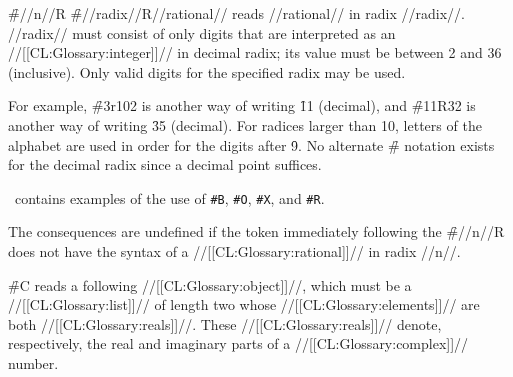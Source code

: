 \endsubsubsection%

  

\f{\#//n//R}
                                                              \f{\#//radix//R//rational//} reads //rational// in radix //radix//. //radix// must consist of only digits that are interpreted as an //[[CL:Glossary:integer]]// in decimal radix; its value must be between 2 and 36 (inclusive). Only valid digits for the specified radix may be used.

For example, \f{\#3r102} is another way of writing \f{11} (decimal),  and \f{\#11R32} is another way of writing \f{35} (decimal).   For radices larger than 10, letters of the alphabet are used in order for the digits after \f{9}. No alternate \f{\#} notation exists for the decimal radix since a decimal point suffices.

\Thenextfigure\ contains examples of the use of {\tt\#B}, {\tt \#O}, {\tt \#X}, and {\tt \#R}.


 The consequences are undefined if the token immediately following the \f{\#//n//R} does not have the syntax of a //[[CL:Glossary:rational]]// in radix //n//.

\endsubsubsection%

  


\f{\#C} reads a following //[[CL:Glossary:object]]//, which must be a //[[CL:Glossary:list]]// of length two whose //[[CL:Glossary:elements]]// are both //[[CL:Glossary:reals]]//. These //[[CL:Glossary:reals]]// denote, respectively, the real and imaginary parts of a //[[CL:Glossary:complex]]// number.

